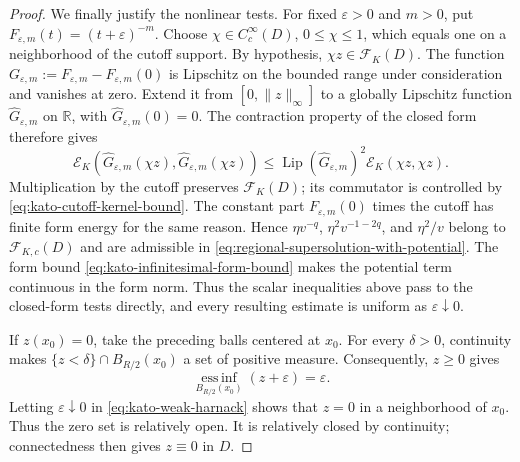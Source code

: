 \documentclass[11pt,reqno]{amsart}
\numberwithin{equation}{section}
\newcommand{\R}{\mathbb R}
\theoremstyle{remark}
\begin{document}
\begin{proof}
We finally justify the nonlinear tests.  For fixed \(\varepsilon>0\)
and \(m>0\), put \(F_{\varepsilon,m}(t)=(t+\varepsilon)^{-m}\).
Choose \(\chi\in C_c^\infty(D)\), \(0\le\chi\le1\), which equals one
on a neighborhood of the cutoff support.  By hypothesis,
\(\chi z\in\mathcal F_K(D)\).
The function
\(G_{\varepsilon,m}:=F_{\varepsilon,m}-F_{\varepsilon,m}(0)\) is
Lipschitz on the bounded range under consideration and vanishes at
zero.  Extend it from \([0,\|z\|_\infty]\) to a globally Lipschitz
function \(\widehat G_{\varepsilon,m}\) on \(\R\), with
\(\widehat G_{\varepsilon,m}(0)=0\).  The contraction property of the
closed form therefore gives
\[
 \mathcal E_K(\widehat G_{\varepsilon,m}(\chi z),
              \widehat G_{\varepsilon,m}(\chi z))
 \le \operatorname{Lip}(\widehat G_{\varepsilon,m})^2
       \mathcal E_K(\chi z,\chi z).
\]
Multiplication by the cutoff preserves \(\mathcal F_K(D)\); its
commutator is controlled by \eqref{eq:kato-cutoff-kernel-bound}.  The
constant part \(F_{\varepsilon,m}(0)\) times the cutoff has finite form
energy for the same reason.  Hence
\(\eta v^{-q}\), \(\eta^2v^{-1-2q}\), and \(\eta^2/v\) belong to
\(\mathcal F_{K,c}(D)\) and are admissible in
\eqref{eq:regional-supersolution-with-potential}.  The form bound
\eqref{eq:kato-infinitesimal-form-bound} makes the potential term
continuous in the form norm.  Thus the scalar inequalities above pass
to the closed-form tests directly, and every resulting estimate is
uniform as \(\varepsilon\downarrow0\).

If \(z(x_0)=0\), take the preceding balls centered at \(x_0\).
For every \(\delta>0\), continuity makes
\(\{z<\delta\}\cap B_{R/2}(x_0)\) a set of positive measure.
Consequently, \(z\ge0\) gives
\[
 \operatorname*{ess\,inf}_{B_{R/2}(x_0)}(z+\varepsilon)=\varepsilon.
\]
Letting \(\varepsilon\downarrow0\) in
\eqref{eq:kato-weak-harnack} shows that \(z=0\) in a neighborhood of
\(x_0\).  Thus the zero set is relatively open.  It is relatively
closed by continuity; connectedness then gives \(z\equiv0\) in \(D\).
\end{proof}
\end{document}
